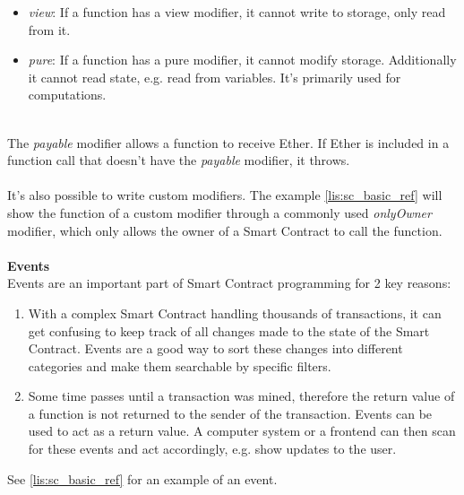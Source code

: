 \begin{itemize}
  \item \textit{view}: If a function has a view modifier, it cannot write to storage, only read from it.
  \item \textit{pure}: If a function has a pure modifier, it cannot modify storage. Additionally it cannot read state, e.g. read from variables. It's primarily used for computations.
\end{itemize}
\leavevmode
\\
The \textit{payable} modifier allows a function to receive Ether. If Ether is included in a function call that doesn't have the \textit{payable} modifier, it throws.
\\\\
It's also possible to write custom modifiers. The example \ref{lis:sc_basic_ref} will show the function of a custom modifier through a commonly used \textit{onlyOwner} modifier, which only allows the owner of a Smart Contract to call the function.
\\\\
\textbf{Events}\\
Events are an important part of Smart Contract programming for 2 key reasons:
\begin{enumerate}
  \item With a complex Smart Contract handling thousands of transactions, it can get confusing to keep track of all changes made to the state of the Smart Contract. Events are a good way to sort these changes into different categories and make them searchable by specific filters.
  \item Some time passes until a transaction was mined, therefore the return value of a function is not returned to the sender of the transaction. Events can be used to act as a return value. A computer system or a frontend can then scan for these events and act accordingly, e.g. show updates to the user.  
\end{enumerate}
See \ref{lis:sc_basic_ref} for an example of an event.
\\\\
